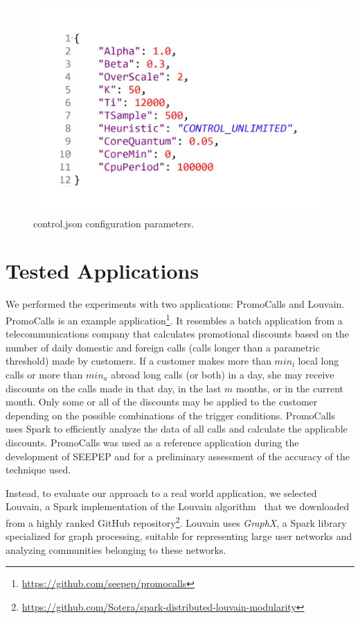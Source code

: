 \begin{figure}[thbp]
	\centering
	\includegraphics[width=\columnwidth]{images/xspark_control_unlimited_parms.pdf}
	\caption{control.json \cSpark configuration parameters.}
	\label{fig:xSparkConfigParms}
\end{figure}

\section{Tested Applications}\label{sec:tested_apps}
We performed the experiments with two applications: 
PromoCalls and Louvain. PromoCalls is an example application\footnote{\url{https://github.com/seepep/promocalls}}.
It resembles a batch application from a telecommunications company that calculates promotional discounts based on the number of daily domestic and foreign calls (calls longer than a parametric threshold) made by customers. 
If a customer makes more than  $min_l$ local long calls or more than $min_a$ abroad long calls (or both) in a day, she may receive discounts on the calls made in that day, in the last $m$ months, or in the current month. 
Only some or all of the discounts may be applied to the customer depending on the possible combinations of the trigger conditions. 
PromoCalls uses Spark to efficiently analyze the data of all calls and calculate the applicable discounts.
PromoCalls was used as a reference application during the development of SEEPEP and for a preliminary assessment of the accuracy of the technique used.

Instead, to evaluate our approach to a real world application, we selected Louvain, a Spark implementation of the Louvain algorithm~\cite{Louvain} that we downloaded from a highly ranked GitHub repository\footnote{\url{https://github.com/Sotera/spark-distributed-louvain-modularity}}. Louvain uses \textit{GraphX}, a Spark library specialized for graph processing, suitable for representing large user networks and analyzing communities belonging to these networks.

